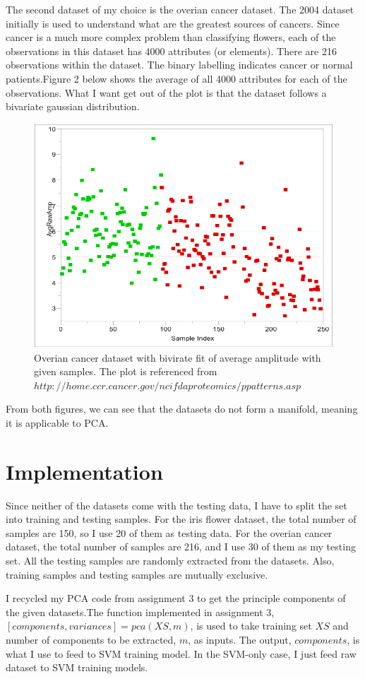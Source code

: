 \documentclass[11pt]{article}
\begin{document}
The second dataset of my choice is the overian cancer dataset. The 2004 dataset initially is used to understand what are the greatest sources of 
cancers. Since cancer is a much more complex problem than classifying flowers, each of the observations in this dataset has 4000 attributes (or elements). There are 216 observations within the dataset. The binary labelling indicates cancer or normal patients.Figure 2 below shows the average of all 4000 attributes for each of the observations. What I want get out of the plot is that the dataset follows a bivariate gaussian distribution. 
\begin{figure}[H]
\centering
\includegraphics[width=120mm]{cancer.jpg}
\caption{ Overian cancer dataset with bivirate fit of average amplitude with given samples. The plot is referenced from $http://home.ccr.cancer.gov/ncifdaproteomics/ppatterns.asp$ \label{problem1Pic2}}
\end{figure}
\par
From both figures, we can see that the datasets do not form a manifold, meaning it is applicable to PCA. 

\section{Implementation}
Since neither of the datasets come with the testing data, I have to split the set into training and testing samples. For the iris flower dataset, the total number of samples are 150, so I use 20 of them as testing data. For the overian cancer dataset, the total number of samples are 216, and I use 30 of them as my testing set. All the testing samples are randomly extracted from the datasets. Also, training samples and testing samples are mutually exclusive.\par
I recycled my PCA code from assignment 3 to get the principle components of the given datasets.The function implemented in assignment 3, $[components, variances]=pca(XS,m)$, is used to take training set $XS$ and number of components to be extracted, $m$, as inputs. The output, $components$, is what I use to feed to SVM training model. In the SVM-only case, I just feed raw dataset to SVM training models.\par
\end{document}
